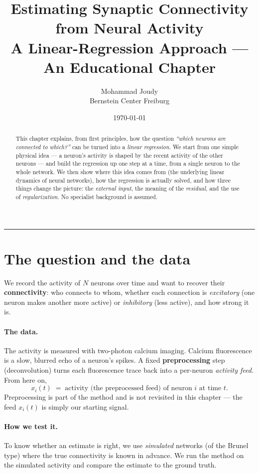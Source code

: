 \documentclass[11pt,a4paper]{article}
\title{\textbf{Estimating Synaptic Connectivity from Neural Activity}\\[4pt]
\large A Linear-Regression Approach --- An Educational Chapter}
\author{Mohammad Joudy \\ \small Bernstein Center Freiburg}
\date{\today}
\begin{document}
\maketitle

\begin{abstract}
\noindent
This chapter explains, from first principles, how the question
\emph{``which neurons are connected to which?''} can be turned into a
\emph{linear regression}. We start from one simple physical idea --- a neuron's
activity is shaped by the recent activity of the other neurons --- and build the
regression up one step at a time, from a single neuron to the whole network. We
then show where this idea comes from (the underlying linear dynamics of neural
networks), how the regression is actually solved, and how three things change
the picture: the \emph{external input}, the meaning of the \emph{residual}, and
the use of \emph{regularization}. No specialist background is assumed.
\end{abstract}

\tableofcontents
\vspace{1em}
\hrule
\vspace{1em}

\section{The question and the data}

We record the activity of $N$ neurons over time and want to recover their
\textbf{connectivity}: who connects to whom, whether each connection is
\emph{excitatory} (one neuron makes another more active) or \emph{inhibitory}
(less active), and how strong it is.

\paragraph{The data.}
The activity is measured with two-photon calcium imaging. Calcium fluorescence
is a slow, blurred echo of a neuron's spikes. A fixed \textbf{preprocessing}
step (deconvolution) turns each fluorescence trace back into a per-neuron
\emph{activity feed}. From here on,
\[
x_i(t) \;=\; \text{activity (the preprocessed feed) of neuron } i \text{ at time } t .
\]
Preprocessing is part of the method and is not revisited in this chapter --- the
feed $x_i(t)$ is simply our starting signal.

\paragraph{How we test it.}
To know whether an estimate is right, we use \emph{simulated} networks (of the
Brunel type) where the true connectivity is known in advance. We run the method
on the simulated activity and compare the estimate to the ground truth.
\end{document}
